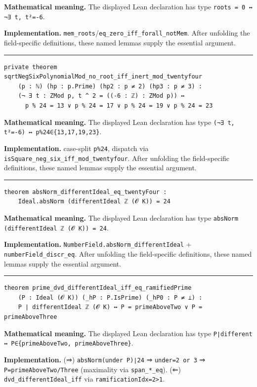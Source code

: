 \documentclass[UTF8,a4paper,11pt,fontset=fandol]{ctexart}
\theoremstyle{definition}
\newcommand{\statementsep}{\par\medskip\hrule\medskip}
\begin{document}
\noindent\textbf{Mathematical meaning.} The displayed Lean declaration has type \texttt{roots = 0 ↔ ¬∃ t, t²=-6}.\par
\noindent\textbf{Implementation.} \texttt{mem\_\allowbreak{}roots}/\texttt{eq\_\allowbreak{}zero\_\allowbreak{}iff\_\allowbreak{}forall\_\allowbreak{}notMem}. After unfolding the field-specific definitions, these named lemmas supply the essential argument.\par
\statementsep
\begin{verbatim}
private theorem sqrtNegSixPolynomialMod_no_root_iff_inert_mod_twentyfour
    (p : ℕ) (hp : p.Prime) (hp2 : p ≠ 2) (hp3 : p ≠ 3) :
    (¬ ∃ t : ZMod p, t ^ 2 = ((-6 : ℤ) : ZMod p)) ↔
      p % 24 = 13 ∨ p % 24 = 17 ∨ p % 24 = 19 ∨ p % 24 = 23
\end{verbatim}
\noindent\textbf{Mathematical meaning.} The displayed Lean declaration has type \texttt{(¬∃ t, t²=-6) ↔ p\%24∈\{13,17,19,23\}}.\par
\noindent\textbf{Implementation.} case-split \texttt{p\%24}, dispatch via \texttt{isSquare\_\allowbreak{}neg\_\allowbreak{}six\_\allowbreak{}iff\_\allowbreak{}mod\_\allowbreak{}twentyfour}. After unfolding the field-specific definitions, these named lemmas supply the essential argument.\par
\statementsep
\begin{verbatim}
theorem absNorm_differentIdeal_eq_twentyFour :
    Ideal.absNorm (differentIdeal ℤ (𝓞 K)) = 24
\end{verbatim}
\noindent\textbf{Mathematical meaning.} The displayed Lean declaration has type \texttt{absNorm (differentIdeal ℤ (𝓞 K)) = 24}.\par
\noindent\textbf{Implementation.} \texttt{NumberField.\allowbreak{}absNorm\_\allowbreak{}differentIdeal} + \texttt{numberField\_\allowbreak{}discr\_\allowbreak{}eq}. After unfolding the field-specific definitions, these named lemmas supply the essential argument.\par
\statementsep
\begin{verbatim}
theorem prime_dvd_differentIdeal_iff_eq_ramifiedPrime
    (P : Ideal (𝓞 K)) (_hP : P.IsPrime) (_hP0 : P ≠ ⊥) :
    P ∣ differentIdeal ℤ (𝓞 K) ↔ P = primeAboveTwo ∨ P = primeAboveThree
\end{verbatim}
\noindent\textbf{Mathematical meaning.} The displayed Lean declaration has type \texttt{P∣different ↔ P∈\{primeAboveTwo, primeAboveThree\}}.\par
\noindent\textbf{Implementation.} (⇒) \texttt{absNorm(under P)∣24} ⇒ \texttt{under=2 or 3} ⇒ \texttt{P=primeAboveTwo/\allowbreak{}Three} (maximality via \texttt{span\_\allowbreak{}*\_\allowbreak{}eq}). (⇐) \texttt{dvd\_\allowbreak{}differentIdeal\_\allowbreak{}iff} via \texttt{ramificationIdx=2>1}.\par
\end{document}
